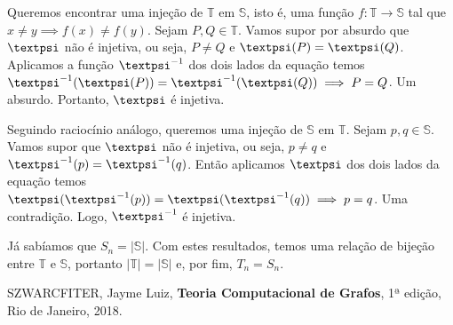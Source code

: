 \documentclass{homework}
\begin{document}
	\subsubquest Queremos encontrar uma injeção de $\mathbb{T}$ em $\mathbb{S}$, isto é, uma função $f: \mathbb{T} \to \mathbb{S}$ tal que $x \neq y \implies f(x) \neq f(y)$. Sejam $P, Q \in \mathbb{T}$. Vamos supor por absurdo que $\text{\textpsi}$ não é injetiva, ou seja, $P \neq Q$ e $\text{\textpsi}(P) = \text{\textpsi}(Q)$. Aplicamos a função $\text{\textpsi}^{-1}$ dos dois lados da equação temos $\text{\textpsi}^{-1}(\text{\textpsi}(P)) = \text{\textpsi}^{-1}(\text{\textpsi}(Q)) \implies P = Q$. Um absurdo. Portanto, $\text{\textpsi}$ é injetiva.\par
	
	\subsubquest Seguindo raciocínio análogo, queremos uma injeção de $\mathbb{S}$ em $\mathbb{T}$. Sejam $p, q \in \mathbb{S}$. Vamos supor que $\text{\textpsi}$ não é injetiva, ou seja, $p \neq q$ e $\text{\textpsi}^{-1}(p) = \text{\textpsi}^{-1}(q)$. Então aplicamos $\text{\textpsi}$ dos dois lados da equação temos $\text{\textpsi}(\text{\textpsi}^{-1}(p)) = \text{\textpsi}(\text{\textpsi}^{-1}(q)) \implies p = q$. Uma contradição. Logo,
	$\text{\textpsi}^{-1}$ é injetiva.\par
	
	Já sabíamos que $S_n = |\mathbb{S}|$. Com estes resultados, temos uma relação de bijeção entre $\mathbb{T}$ e $\mathbb{S}$, portanto $|\mathbb{T}| =  |\mathbb{S}|$ e, por fim, $T_n = S_n$.\par
	
	\begin{thebibliography}{10}
		 SZWARCFITER, Jayme Luiz, \textbf{Teoria Computacional de Grafos}, 1ª edição, Rio de Janeiro, 2018.
	\end{thebibliography}
\end{document}
